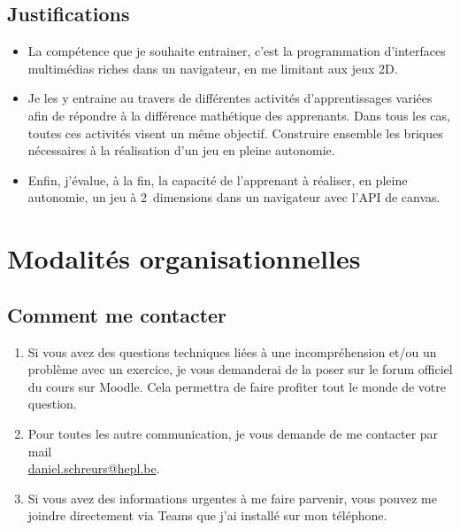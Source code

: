 \subsection{Justifications}
\begin{itemize}
    \item La compétence que je souhaite entrainer, c'est la programmation d'interfaces multimédias riches dans un navigateur, en me limitant aux jeux 2D.
    \item Je les y entraine au travers de différentes activités d'apprentissages variées afin de répondre à la différence mathétique des apprenants. Dans tous les cas, toutes ces activités visent un même objectif. Construire ensemble les briques nécessaires à la réalisation d'un jeu en pleine autonomie.
    \item Enfin, j'évalue, à la fin, la capacité de l'apprenant à réaliser, en pleine autonomie, un jeu à 2~dimensions dans un navigateur avec l'API de canvas.
\end{itemize}
\clearpage

\section{Modalités organisationnelles}
\subsection{Comment me contacter}
\begin{enumerate}
    \item Si vous avez des questions techniques liées à une incompréhension et/ou un problème avec un exercice, je vous demanderai de la poser sur le forum officiel du cours sur Moodle. Cela permettra de faire profiter tout le monde de votre question.
    \item Pour toutes les autre communication, je vous demande de me contacter par mail\\ \href{mailto:daniel.schreurs@hepl.be}{daniel.schreurs@hepl.be}.
    \item Si vous avez des informations urgentes à me faire parvenir, vous pouvez me joindre directement via Teams que j'ai installé sur mon téléphone.
\end{enumerate}
